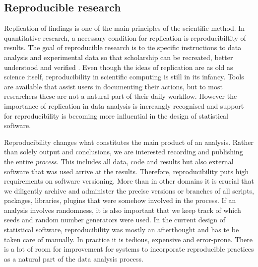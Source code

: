 \subsection{Reproducible research}

Replication of findings is one of the main principles of the scientific method. In quantitative research, a necessary condition for replication is reproducibiltity of results. The goal of reproducible research is to tie specific instructions to data analysis and experimental data so that scholarship can be recreated, better understood and verified \citep{cranRR}. Even though the ideas of replication are as old as science itself, reproducibility in scientific computing is still in its infancy. Tools are available that assist users in documenting their actions, but to most researchers these are not a natural part of their daily workflow. However the importance of replication in data analysis is increangly recognised and support for reproducibility is becoming more influential in the design of statistical software.

Reproducibility changes what constitutes the main product of an analysis. Rather than solely output and conclusions, we are interested recording and publishing the entire \emph{process}. This includes all data, code and results but also external software that was used arrive at the results. Therefore, reproducibility puts high requirements on software versioning. More than in other domains it is crucial that we diligently archive and administer the precise versions or branches of all scripts, packages, libraries, plugins that were somehow involved in the process. If an analysis involves randomness, it is also important that we keep track of which seeds and random number generators were used. In the current design of statistical software, reproducibility was mostly an afterthought and has te be taken care of manually. In practice it is tedious, expensive and error-prone. There is a lot of room for improvement for systems to incorporate reproducible practices as a natural part of the data analysis process.

